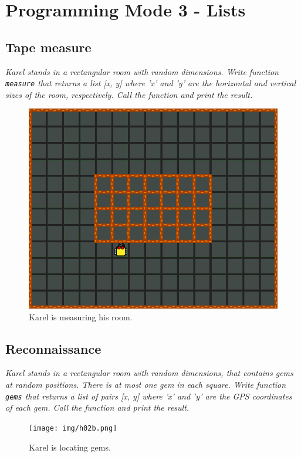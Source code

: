 
\section{Programming Mode 3 - Lists}


\subsection{Tape measure}

{\em Karel stands in a rectangular room with random dimensions. Write function {\tt measure}  
that returns a list [x, y] where 'x' and 'y' are the horizontal and vertical sizes of the room,
respectively. Call the function and print the result.}
\newpage

\begin{figure}[!ht]
\begin{center}
\includegraphics[height=0.4\textwidth]{img/h02.png}
\end{center}
\vspace{-4mm}
\caption{Karel is measuring his room.}
\label{fig:h02}
\end{figure}


\subsection{Reconnaissance}

{\em Karel stands in a rectangular room with random dimensions, that contains gems at random positions. There is at most one gem in each square. Write function {\tt gems}  that returns a list of pairs [x, y] where 'x' and 'y' are the GPS coordinates of each gem. Call the function and print the result.}

\begin{figure}[!ht]
\begin{center}
\texttt{[image: img/h02b.png]}
\end{center}
\vspace{-4mm}
\caption{Karel is locating gems.}
\label{fig:h02b}
\end{figure}



